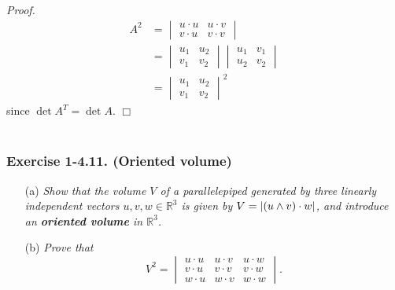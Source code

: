 \documentclass{article}
\begin{document}
\emph{Proof.}
  \begin{align*}
    A^2
    &=
    \begin{vmatrix}
      u \cdot u & u \cdot v \\
      v \cdot u & v \cdot v
    \end{vmatrix} \\
    &=
    \begin{vmatrix}
      u_1 & u_2 \\
      v_1 & v_2
    \end{vmatrix}
    \begin{vmatrix}
      u_1 & v_1 \\
      u_2 & v_2
    \end{vmatrix} \\
    &=
    \begin{vmatrix}
      u_1 & u_2 \\
      v_1 & v_2
    \end{vmatrix}^2
  \end{align*}
  since $\det A^T = \det A$.
$\Box$ \\\\






\subsubsection*{Exercise 1-4.11. (Oriented volume)}
\begin{enumerate}
\item[(a)]
  \emph{Show that the volume $V$ of a parallelepiped generated by three linearly independent vectors
  $u, v, w \in \mathbb{R}^3$ is given by $V = \abs{(u \wedge v) \cdot w}$,
  and introduce an \textbf{oriented volume} in $\mathbb{R}^3$.}

\item[(b)]
  \emph{Prove that}
  \[
    V^2
    = \begin{vmatrix}
      u \cdot u & u \cdot v & u \cdot w \\
      v \cdot u & v \cdot v & v \cdot w \\
      w \cdot u & w \cdot v & w \cdot w
    \end{vmatrix}.
  \]
\end{enumerate}
\end{document}
